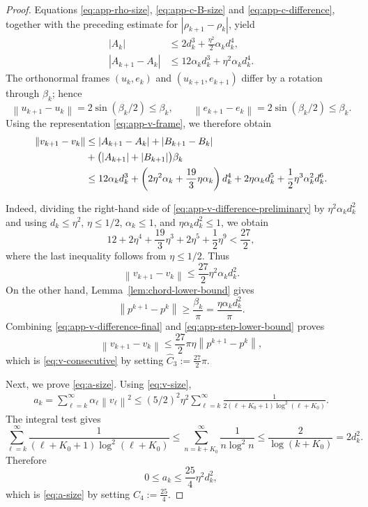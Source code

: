 \documentclass[10pt,a4paper]{amsart}
\newcommand{\norm}[1]{\left\lVert #1\right\rVert}
\begin{document}
\begin{proof}
Equations \eqref{eq:app-rho-size}, \eqref{eq:app-c-B-size} and
\eqref{eq:app-c-difference}, together with the preceding estimate for $|\rho_{k+1}-\rho_k|$, yield
\begin{align}
    |A_k|
    &\leq 2 d_k^3+\frac{\eta^2}{2}\alpha_kd_k^4,
    \label{eq:app-A-size}\\
    |A_{k+1}-A_k|
    &\leq 12\alpha_kd_k^3
          +\eta^2\alpha_kd_k^4.
    \label{eq:app-A-difference}
\end{align}
The orthonormal frames \((u_k,e_k)\) and
\((u_{k+1},e_{k+1})\) differ by a rotation through \(\beta_k\); hence
\[
    \norm{u_{k+1}-u_k}=2\sin(\beta_k/2)\leq\beta_k,
    \qquad
    \norm{e_{k+1}-e_k}=2\sin(\beta_k/2)\leq\beta_k.
\]
Using the representation \eqref{eq:app-v-frame}, we therefore obtain
\begin{align}
    \norm{v_{k+1}-v_k}
    &\leq |A_{k+1}-A_k|+|B_{k+1}-B_k|\notag\\
    &+\bigl(|A_{k+1}|+|B_{k+1}|\bigr)\beta_k\notag\\
    &\leq 12 \alpha_k d_k^3+\left(2\eta^2\alpha_k+\frac{19}{3}\eta\alpha_k\right)d_k^4+2\eta\alpha_k d_k^5+\frac{1}{2}\eta^3\alpha_k^2d_k^6.
    \label{eq:app-v-difference-preliminary}
\end{align}

Indeed, dividing the right-hand side of \eqref{eq:app-v-difference-preliminary} by
$\eta^2\alpha_kd_k^2$ and using
$d_k\leq\eta^2$, $\eta\leq 1/2$, $\alpha_k\leq 1$, and
$\eta\alpha_kd_k^2\leq 1$, we obtain
\[
    12+2\eta^4+\frac{19}{3}\eta^3+2\eta^5
    +\frac12\eta^9
    <\frac{27}{2},
\]
where the last inequality follows from $\eta\leq 1/2$.
Thus
\begin{equation}
    \norm{v_{k+1}-v_k}
    \leq \frac{27}{2}\eta^2\alpha_kd_k^2.
    \label{eq:app-v-difference-final}
\end{equation}
On the other hand, Lemma~\ref{lem:chord-lower-bound} gives
\begin{equation}
    \norm{p^{k+1}-p^k}
    \geq\frac{\beta_k}{\pi}
    =\frac{\eta\alpha_kd_k^2}{\pi}.
    \label{eq:app-step-lower-bound}
\end{equation}
Combining \eqref{eq:app-v-difference-final} and
\eqref{eq:app-step-lower-bound} proves
\[
    \norm{v_{k+1}-v_k}
    \leq \frac{27}{2}\pi\eta\norm{p^{k+1}-p^k},
\]
which is \eqref{eq:v-consecutive} by setting $\widehat C_3:= \frac{27}{2}\pi$.

\medskip
Next, we prove \eqref{eq:a-size}.
Using \eqref{eq:v-size},
\begin{align*}
    a_k=\sum_{\ell=k}^{\infty}\alpha_\ell\norm{v_\ell}^2\leq (5/2)^2\eta^2
      \sum_{\ell=k}^{\infty}
      \frac{1}{2(\ell+K_0+1)\log^2(\ell+K_0)}.
\end{align*}
The integral test gives
\[
    \sum_{\ell=k}^{\infty}
      \frac{1}{(\ell+K_0+1)\log^2(\ell+K_0)}
      \leq\sum_{n=k+K_0}^{\infty}\frac{1}{n\log^2 n}
    \leq\frac{2}{\log(k+K_0)}
    =2 d_k^2.
\]
Therefore
\[
    0\leq a_k\leq \frac{25}{4} \eta^2d_k^2,
\]
which is \eqref{eq:a-size} by setting $\widehat C_4:=\frac{25}{4} $.
\end{proof}
\end{document}
